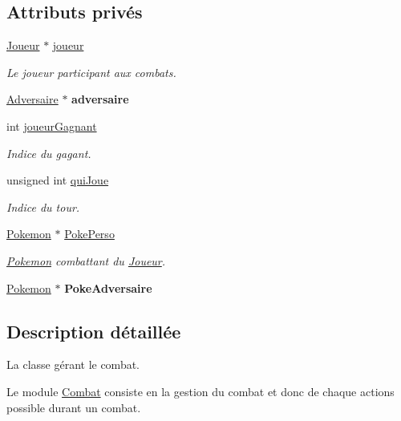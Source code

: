 \subsection*{Attributs privés}
\begin{DoxyCompactItemize}
\item 
\hyperlink{class_joueur}{Joueur} $\ast$ \hyperlink{class_combat_adfc70215a221f8a5071f7e435719f011}{joueur}
\begin{DoxyCompactList}\small\item\em Le joueur participant aux combats. \end{DoxyCompactList}\item 
\mbox{\label{class_combat_a612d3e13c7836b178e3948bd1f311da3}} 
\hyperlink{class_adversaire}{Adversaire} $\ast$ {\bfseries adversaire}
\item 
int \hyperlink{class_combat_a3eb02966f9dc1782e6314683aa784813}{joueur\+Gagnant}
\begin{DoxyCompactList}\small\item\em Indice du gagant. \end{DoxyCompactList}\item 
unsigned int \hyperlink{class_combat_a815de57c00a1b43c53ea930b74198b2c}{qui\+Joue}
\begin{DoxyCompactList}\small\item\em Indice du tour. \end{DoxyCompactList}\item 
\hyperlink{class_pokemon}{Pokemon} $\ast$ \hyperlink{class_combat_acd7f1ec3ffd1779ea492d46189cccb47}{Poke\+Perso}
\begin{DoxyCompactList}\small\item\em \hyperlink{class_pokemon}{Pokemon} combattant du \hyperlink{class_joueur}{Joueur}. \end{DoxyCompactList}\item 
\mbox{\label{class_combat_a63934d3e11592de4cf78f7645f56f7a8}} 
\hyperlink{class_pokemon}{Pokemon} $\ast$ {\bfseries Poke\+Adversaire}
\end{DoxyCompactItemize}


\subsection{Description détaillée}
La classe gérant le combat. 

Le module \hyperlink{class_combat}{Combat} consiste en la gestion du combat et donc de chaque actions possible durant un combat. 

